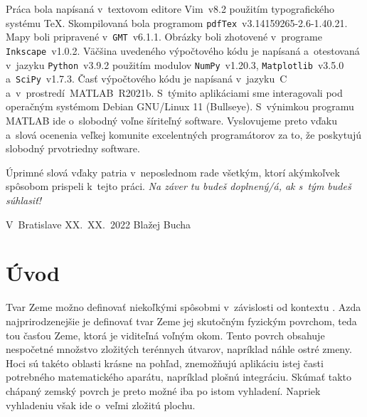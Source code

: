 \documentclass[a4paper, 12pt]{book}
\begin{document}
Práca bola napísaná v~textovom editore Vim~v8.2 použitím typografického systému 
\TeX.  Skompilovaná bola programom \texttt{pdfTex}~v3.14159265-2.6-1.40.21.  
Mapy boli pripravené v~\texttt{GMT}~v6.1.1.  Obrázky boli zhotovené v~programe 
\texttt{Inkscape}~v1.0.2.  Väčšina uvedeného výpočtového kódu je napísaná 
a~otestovaná v~jazyku \texttt{Python}~v3.9.2 použitím modulov 
\texttt{NumPy}~v1.20.3, \texttt{Matplotlib}~v3.5.0 a~\texttt{SciPy}~v1.7.3.  
Časť výpočtového kódu je napísaná v~jazyku~C a~v~prostredí~MATLAB~R2021b.  
S~týmito aplikáciami sme interagovali pod operačným systémom Debian GNU/Linux 
11 (Bullseye).  S~výnimkou programu MATLAB ide o~slobodný voľne šíriteľný 
software.  Vyslovujeme preto vďaku a~slová ocenenia veľkej komunite 
excelentných programátorov za to, že poskytujú slobodný prvotriedny software.

Úprimné slová vďaky patria v~neposlednom rade všetkým, ktorí akýmkoľvek 
spôsobom prispeli k~tejto práci. \emph{Na záver tu budeš doplnený/á, ak s~tým 
budeš súhlasiť!}


\vspace{4ex}

\noindent V~Bratislave XX.~XX.~2022 \hfill Blažej Bucha






\tableofcontents
\newpage







\chapter{Úvod}

Tvar Zeme možno definovať niekoľkými spôsobmi v~závislosti od kontextu 
\citep{MoritzTheFigureOfTheEarth}.  Azda najprirodzenejšie je definovať tvar 
Zeme jej skutočným fyzickým povrchom, teda tou časťou Zeme, ktorá je viditeľná 
voľným okom.  Tento povrch obsahuje nespočetné množstvo zložitých terénnych 
útvarov, napríklad náhle ostré zmeny.  Hoci sú takéto oblasti krásne na pohľad, 
znemožňujú aplikáciu istej časti potrebného matematického aparátu, napríklad 
plošnú integráciu.  Skúmať takto chápaný zemský povrch je preto možné iba po 
istom vyhladení.  Napriek vyhladeniu však ide o~veľmi zložitú plochu.
\end{document}
